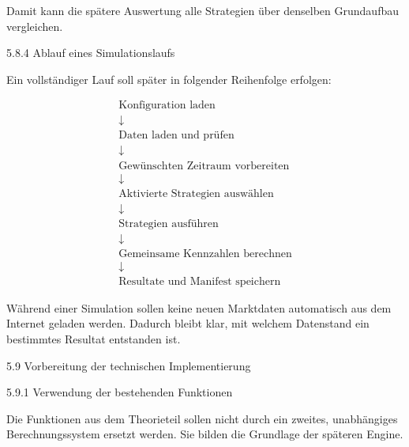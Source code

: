 \documentclass[
  ngerman,
  a4paper,
  DIV=11,
  oneside]{scrreprt}
\begin{document}
Damit kann die spätere Auswertung alle Strategien über denselben
Grundaufbau vergleichen.

5.8.4 Ablauf eines Simulationslaufs

Ein vollständiger Lauf soll später in folgender Reihenfolge erfolgen:

\[
\begin{array}{c}
\boxed{\text{Konfiguration laden}} \\[6pt]
\downarrow \\[6pt]
\boxed{\text{Daten laden und prüfen}} \\[6pt]
\downarrow \\[6pt]
\boxed{\text{Gewünschten Zeitraum vorbereiten}} \\[6pt]
\downarrow \\[6pt]
\boxed{\text{Aktivierte Strategien auswählen}} \\[6pt]
\downarrow \\[6pt]
\boxed{\text{Strategien ausführen}} \\[6pt]
\downarrow \\[6pt]
\boxed{\text{Gemeinsame Kennzahlen berechnen}} \\[6pt]
\downarrow \\[6pt]
\boxed{\text{Resultate und Manifest speichern}}
\end{array}
\]

Während einer Simulation sollen keine neuen Marktdaten automatisch aus
dem Internet geladen werden. Dadurch bleibt klar, mit welchem Datenstand
ein bestimmtes Resultat entstanden ist.

5.9 Vorbereitung der technischen Implementierung

5.9.1 Verwendung der bestehenden Funktionen

Die Funktionen aus dem Theorieteil sollen nicht durch ein zweites,
unabhängiges Berechnungssystem ersetzt werden. Sie bilden die Grundlage
der späteren Engine.
\end{document}
